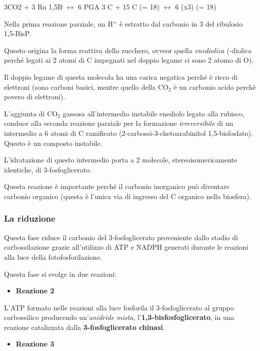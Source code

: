 \documentclass[]{article}
\begin{document}
3CO2 + 3 Ru 1,5B $\leftrightarrow$ 6 PGA 3 C + 15 C (= 18)
$\leftrightarrow$ 6 (x3) (= 18)

Nella prima reazione parziale, un H$^+$ è estratto dal carbonio in 3 del
ribulosio 1,5-BisP.

Questo origina la forma reattiva dello zucchero, ovveor quella
\emph{enediolica} (-diolica perché legati ai 2 atomi di C impegnati nel
doppio legame ci sono 2 atomo di O).

Il doppio legame di questa molecola ha una carica negatica perché è
ricco di elettroni (sono carboni basici, mentre quello della CO$_2$ è un
carbonio acido perchè povero di elettroni).

L'aggiunta di CO$_2$ gassosa all'intermedio instabile enediolo legato
alla rubisco, conduce alla seconda reazione parziale per la formazione
\emph{irreversibile} di un intermedio a 6 atomi di C ramificato
(2-carbossi-3-chetoarabinitol 1,5-bisfosfato). Questo è un composto
instabile.

L'idratazione di questo intermedio porta a 2 molecole,
stereoisomericamente identiche, di 3-fosfoglicerato.

Questa reazione è importante perché il carbonio inorganico può diventare
carbonio organico (questa è l'unica via di ingresso del C organico nella
biosfera).

\subsubsection{La riduzione}\label{la-riduzione}

Questa fase riduce il carbonio del 3-fosfoglicerato proveniente dallo
stadio di carbossilazione grazie all'utilizzo di ATP e NADPH generati
durante le reazioni alla luce della fotofosforilazione.

Questa fase si svolge in due reazioni:

\begin{itemize}
\itemsep1pt\parskip0pt
\item
  \textbf{Reazione 2}
\end{itemize}

L'ATP formato nelle reazioni alla luce fosforila il 3-fosfoglicerato al
gruppo carbossilico producendo un'\emph{anidride mista},
l'\textbf{1,3-bisfosfoglicerato}, in una reazione catalizzata dalla
\textbf{3-fosfoglicerato chinasi}.

\begin{itemize}
\itemsep1pt\parskip0pt
\item
  \textbf{Reazione 3}
\end{itemize}
\end{document}
